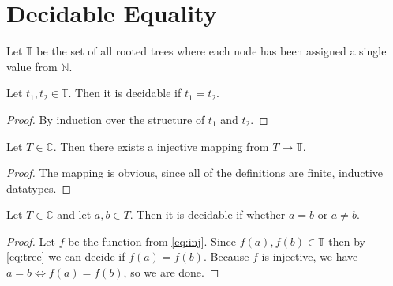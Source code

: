 \section{Decidable Equality}

\begin{definition}
  Let $\mathbb{T}$ be the set of all rooted trees where each node has been
  assigned a single value from $\mathbb{N}$.
\end{definition}

\begin{lemma}
  Let $t_1, t_2 \in \mathbb{T}$. Then it is decidable if $t_1 = t_2$.
\end{lemma}
\label{eq:tree}
\begin{proof}
  By induction over the structure of $t_1$ and $t_2$.
\end{proof}

\begin{lemma}
  Let $T \in \mathbb{C}$. Then there exists a injective mapping from
  $T \to \mathbb{T}$.
\end{lemma}
\label{eq:inj}
\begin{proof}
  The mapping is obvious, since all of the definitions are finite, inductive
  datatypes.
\end{proof}

\begin{corollary}
  Let $T \in \mathbb{C}$ and let $a, b \in T$. Then it is decidable if whether
  $a=b$ or $a \neq b$.
\end{corollary}
\label{dec:eq}
\begin{proof}
  Let $f$ be the function from \autoref{eq:inj}. Since
  $f(a), f(b) \in \mathbb{T}$ then by \autoref{eq:tree} we can decide if
  $f(a) = f(b)$. Because $f$ is injective, we have $a = b \iff f(a) = f(b)$, so
  we are done.
\end{proof}

